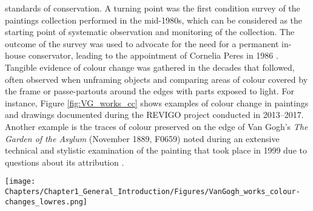 standards of conservation. A turning point was the first condition survey of the paintings collection performed in the mid-1980s, which can be considered as the starting point of systematic observation and monitoring of the collection. The outcome of the survey was used to advocate for the need for a permanent in-house conservator, leading to the appointment of Cornelia Peres in 1986 \citep[35–6]{hendriks_vincent_2011}. Tangible evidence of colour change was gathered in the decades that followed, often observed when unframing objects and comparing areas of colour covered by the frame or passe-partouts around the edges with parts exposed to light. For instance, Figure \ref{fig:VG_works_cc} shows examples of colour change in paintings and drawings documented during the \gls{REVIGO} project conducted in 2013–2017. Another example is the traces of colour preserved on the edge of Van Gogh’s \textit{The Garden of the Asylum} (November 1889, F0659) noted during an extensive technical and stylistic examination of the painting that took place in 1999 due to questions about its attribution \citep[Figures 26 and 27]{hendriks_van_2001}. \\


\begin{figure*}[!h]
\centering
\texttt{[image: Chapters/Chapter1\_General\_Introduction/Figures/VanGogh\_works\_colour-changes\_lowres.png]}
\caption[\hspace{0.3cm}Examples of colour changes on Van Gogh's works]{Examples of colour changes on Van Gogh's works: F0409(a), F1423(b) (\copyright Van Gogh Museum, Amsterdam (Vincent van Gogh Foundation)).}
\label{fig:VG_works_cc}
\end{figure*}

